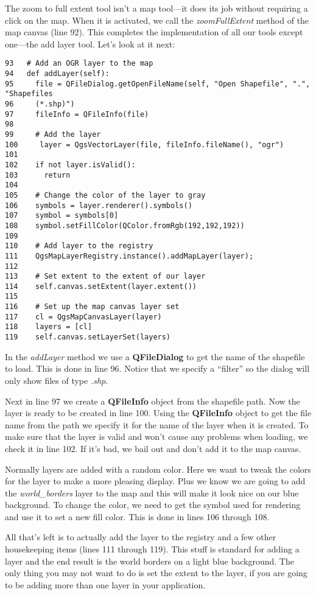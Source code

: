 The zoom to full extent tool isn't a map tool---it does its job without
requiring a click on the map. When it is activated, we call the
\textsl{zoomFullExtent} method of the map canvas (line 92).
This completes the implementation of all our tools except one---the add
layer tool. Let's look at it next:

\begin{verbatim}
93   # Add an OGR layer to the map
94   def addLayer(self):
95     file = QFileDialog.getOpenFileName(self, "Open Shapefile", ".", "Shapefiles
96     (*.shp)")
97     fileInfo = QFileInfo(file)
98 
99     # Add the layer
100     layer = QgsVectorLayer(file, fileInfo.fileName(), "ogr")
101
102    if not layer.isValid():
103      return
104
105    # Change the color of the layer to gray
106    symbols = layer.renderer().symbols()
107    symbol = symbols[0]
108    symbol.setFillColor(QColor.fromRgb(192,192,192))
109
110    # Add layer to the registry
111    QgsMapLayerRegistry.instance().addMapLayer(layer);
112
113    # Set extent to the extent of our layer
114    self.canvas.setExtent(layer.extent())
115
116    # Set up the map canvas layer set
117    cl = QgsMapCanvasLayer(layer)
118    layers = [cl]
119    self.canvas.setLayerSet(layers)
\end{verbatim}

In the \textsl{addLayer} method we use a \textbf{QFileDialog} to get the
name of the shapefile to load. This is done in line 96.
Notice that we specify a ``filter'' so the dialog will only show files of
type \textsl{.shp}.

Next in line 97 we create a \textbf{QFileInfo} object from the shapefile path. Now the layer is
ready to be created in line 100. Using the \textbf{QFileInfo} object to get the file name
from the path we specify it for the name of the layer when it is created. To make sure that the layer is valid and won't
cause any problems when loading, we check it in line 102. If it's bad, we bail out and don't add it to
the map canvas.

Normally layers are added with a random color. Here we want to tweak the colors for the layer to make a more pleasing
display. Plus we know we are going to add the \textsl{world\_borders} layer to the map and this will make it look nice
on our blue background. To change the color, we need to get the symbol used for rendering and use it to set a new fill color. This is done in lines
106 through 108. 

All that's left is to actually add the layer to the registry and a few other housekeeping items (lines
111 through 119). This stuff is standard for adding a layer and the
end result is the world borders on a light blue background. The only thing you may not want to do is set the extent to
the layer, if you are going to be adding more than one layer in your application.


